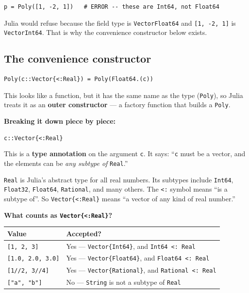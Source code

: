 \documentclass[12pt, a4paper]{article}
\newcommand{\cd}[1]{\texttt{#1}}
\begin{document}
\begin{verbatim}
p = Poly([1, -2, 1])   # ERROR -- these are Int64, not Float64
\end{verbatim}

Julia would refuse because the field type is \cd{Vector{Float64}}
and \cd{[1, -2, 1]} is \cd{Vector{Int64}}.
That is why the convenience constructor below exists.

\subsection{The convenience constructor}

\begin{verbatim}
Poly(c::Vector{<:Real}) = Poly(Float64.(c))
\end{verbatim}

This looks like a function, but it has the same name as the type
(\cd{Poly}), so Julia treats it as an \textbf{outer constructor} ---
a factory function that builds a \cd{Poly}.

\textbf{Breaking it down piece by piece:}

\medskip
\cd{c::Vector\{<:Real\}}

This is a \textbf{type annotation} on the argument \cd{c}.
It says: ``\cd{c} must be a vector, and the elements can be
\emph{any subtype of} \cd{Real}.''

\cd{Real} is Julia's abstract type for all real numbers.
Its subtypes include \cd{Int64}, \cd{Float32}, \cd{Float64},
\cd{Rational}, and many others.
The \cd{<:} symbol means ``is a subtype of''.
So \cd{Vector\{<:Real\}} means ``a vector of any kind of real number.''

\begin{examplebox}
\textbf{What counts as \cd{Vector\{<:Real\}}?}

\medskip
\begin{tabular}{ll}
\toprule
Value & Accepted? \\
\midrule
\cd{[1, 2, 3]}         & Yes --- \cd{Vector\{Int64\}}, and \cd{Int64 <: Real} \\
\cd{[1.0, 2.0, 3.0]}   & Yes --- \cd{Vector\{Float64\}}, and \cd{Float64 <: Real} \\
\cd{[1//2, 3//4]}      & Yes --- \cd{Vector\{Rational\}}, and \cd{Rational <: Real} \\
\cd{["a", "b"]}        & No  --- \cd{String} is not a subtype of \cd{Real} \\
\bottomrule
\end{tabular}
\end{examplebox}
\end{document}
